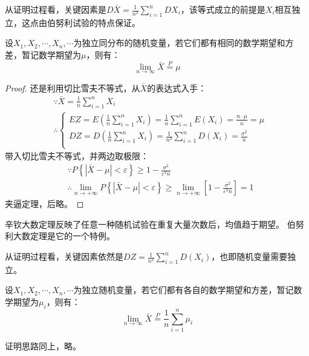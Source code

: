 从证明过程看，关键因素是$D\bar{X}=\frac{1}{n^2}\sum_{i=1}^n{DX_i}$，该等式成立的前提是$X_i$相互独立，这点由伯努利试验的特点保证。

\begin{theorem}[辛钦大数定理]
设$X_1,X_2,\cdots ,X_n,\cdots $为独立同分布的随机变量，若它们都有相同的数学期望和方差，暂记数学期望为$\mu $，则有：
\[
\underset{n\rightarrow \infty}{\lim}\bar{X}\overset{P}{=}\mu
\]
\end{theorem}

\begin{proof}
还是利用切比雪夫不等式，从$\bar{X}$的表达式入手：
\begin{align*}
&\because \bar{X}=\frac{1}{n}\sum_{i=1}^n{X_i} \\
&\therefore \begin{cases}
	EZ=E\left( \frac{1}{n}\sum_{i=1}^n{X_i} \right) =\frac{1}{n}\sum_{i=1}^n{E\left( X_i \right)}=\frac{n\cdot \mu}{n}=\mu\\
	DZ=D\left( \frac{1}{n}\sum_{i=1}^n{X_i} \right) =\frac{1}{n^2}\sum_{i=1}^n{D\left( X_i \right)}=\frac{\sigma ^2}{n}\\
\end{cases}
\end{align*}
带入切比雪夫不等式，并两边取极限：
\begin{align*}
&\because P\left\{ \left| \bar{X}-\mu \right|<\varepsilon \right\} \geqslant 1-\frac{\sigma ^2}{\varepsilon ^2n} \\
&\therefore \underset{n\rightarrow +\infty}{\lim}P\left\{ \left| \bar{X}-\mu \right|<\varepsilon \right\} \geqslant \underset{n\rightarrow +\infty}{\lim}\left[ 1-\frac{\sigma ^2}{\varepsilon ^2n} \right] =1
\end{align*}
夹逼定理，后略。
\end{proof}

辛钦大数定理反映了任意一种随机试验在重复大量次数后，均值趋于期望。
伯努利大数定理是它的一个特例。

从证明过程看，关键因素依然是$DZ=\frac{1}{n^2}\sum_{i=1}^n{D\left( X_i \right)}$，也即随机变量需要独立。

\begin{theorem}[切比雪夫大数定理]
设$X_1,X_2,\cdots ,X_n,\cdots $为独立随机变量，若它们都有各自的数学期望和方差，暂记数学期望为$\mu _i$，则有：
\[
\underset{n\rightarrow \infty}{\lim}\bar{X}\overset{P}{=}\frac{1}{n}\sum_{i=1}^n{\mu _i}
\]
\end{theorem}

证明思路同上，略。

